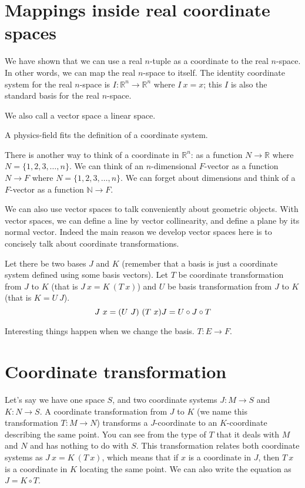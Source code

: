 \section{Mappings inside real coordinate spaces}

We have shown that we can use a real $n$-tuple as a coordinate to the real $n$-space.
In other words, we can map the real $n$-space to itself.
The identity coordinate system for the real $n$-space is
$I : \mathbb{R}^n \to \mathbb{R}^n$ where $I~x = x$;
this $I$ is also the standard basis for the real $n$-space.

We also call a vector space a linear space.

A physics-field fits the definition of a coordinate system.

There is another way to think of a coordinate in $\mathbb{R}^n$:
as a function $N \to \mathbb{R}$ where $N = \{1,2,3,\ldots,n\}$.
We can think of an $n$-dimensional $F$-vector as a function $N \to F$ where $N = \{1,2,3,\ldots,n\}$.
We can forget about dimensions and think of a $F$-vector as a function $\mathbb{N} \to F$.

We can also use vector spaces to talk conveniently about geometric objects.
With vector spaces, we can define a line by vector collinearity,
and define a plane by its normal vector.
Indeed the main reason we develop vector spaces here is to concisely
talk about coordinate transformations.

Let there be two bases
$J$ and $K$ (remember that a basis is just a coordinate system defined using some basis vectors).
Let $T$ be coordinate transformation from $J$ to $K$
(that is $J~x = K~(T~x)$)
and $U$ be basis transformation from $J$ to $K$
(that is $K = U~J$).
\[
J~x = (U~J)~(T~x)
\\ J = U \circ J \circ T
\]

Interesting things happen when we change the basis.
$T : E \to F$.

\section{Coordinate transformation}

Let's say we have one space $S$,
and two coordinate systems $J : M \to S$ and $K : N \to S$.
A coordinate transformation from $J$ to $K$ (we name this transformation $T : M \to N$)
transforms a $J$-coordinate
to an $K$-coordinate describing the same point.
You can see from the type of $T$ that it deals with $M$ and $N$
and has nothing to do with $S$.
This transformation relates both coordinate systems as
$J~x = K~(T~x)$, which means that if $x$ is a coordinate in $J$, then $T~x$ is a coordinate in $K$ locating the same point.
We can also write the equation as $J = K \circ T$.

